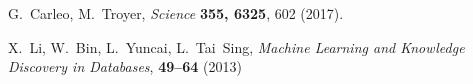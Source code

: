 \documentclass[nofootinbib, superscriptaddress, prl]{revtex4}
\begin{document}
 
\begin{thebibliography}{10}

G.~Carleo, M.~Troyer, {\it Science\/} {\bf 355, 6325}, 602
  (2017).

X.~Li, W.~Bin, L.~Yuncai, L.~Tai~Sing, {\it Machine Learning and Knowledge Discovery in Databases}, {\bf 49--64} (2013)

\end{thebibliography} 

%
%
%
%
%
%
\end{document}
